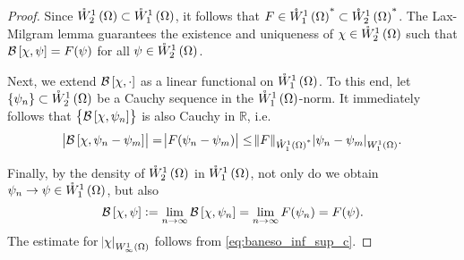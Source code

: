 \documentclass[final]{siamltex}
\begin{document}
\begin{proof}Since ${{\mathring{W}^{{1}}_{{2}}\del{{\Omega}}}} \subset {{\mathring{W}^{{1}}_{{1}}\del{{\Omega}}}}$, it follows that $F \in {{\mathring{W}^{{1}}_{{1}}\del{{\Omega}}}}^* \subset {{\mathring{W}^{{1}}_{{2}}\del{{\Omega}}}}^*$. The Lax-Milgram lemma guarantees the existence and uniqueness of $\chi \in {{\mathring{W}^{{1}}_{{2}}\del{{\Omega}}}}$ such that ${\mathcal{B}}\sbr{\chi,\psi} = F(\psi)$ for all $\psi \in {{\mathring{W}^{{1}}_{{2}}\del{{\Omega}}}}$. 

Next, we extend ${\mathcal{B}}\sbr{\chi,\cdot}$ as a linear functional on ${{\mathring{W}^{{1}}_{{1}}\del{{\Omega}}}}$. To this end, let ${\cbr{{\psi_n}}}\subset {{\mathring{W}^{{1}}_{{2}}\del{{\Omega}}}}$ be a Cauchy sequence in the ${{\mathring{W}^{{1}}_{{1}}\del{{\Omega}}}}$-norm. It immediately follows that ${\cbr{{{\mathcal{B}}\sbr{\chi,\psi_n}}}}$ is also Cauchy in ${\mathbb{R}}$, i.e. $$\abs{{\mathcal{B}}\sbr{\chi,\psi_n-\psi_m}} = \abs{F(\psi_n - \psi_m)} \leq \norm{F}_{{{\mathring{W}^{1}_{1}\del{\Omega}}}^*}{\abs{{\psi_n - \psi_m}}_{{W^{{1}}_{{1}}\del{{\Omega}}}}}.$$ 

Finally, by the density of ${{\mathring{W}^{{1}}_{{2}}\del{{\Omega}}}}$ in ${{\mathring{W}^{1}_{1}\del{\Omega}}}$, not only do we obtain $\psi_n\to \psi \in {{\mathring{W}^{1}_{1}\del{\Omega}}}$, but also  $${\mathcal{B}}\sbr{\chi, \psi} := \lim_{n\to\infty} {\mathcal{B}}\sbr{\chi, \psi_n} = \lim_{n\to\infty} F(\psi_n) = F(\psi).$$ The estimate for ${\abs{{\chi}}_{{W^{{1}}_{{\infty}}\del{{{\Omega}}}}}}$ follows from \eqref{eq:baneso_inf_sup_c}.
\end{proof}
\end{document}
